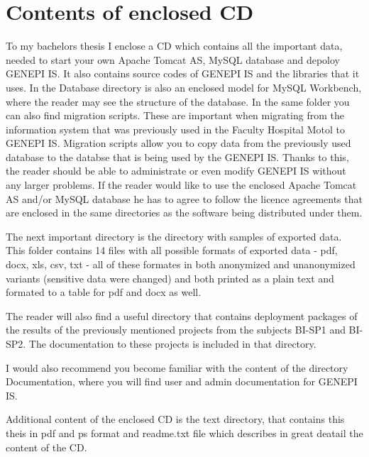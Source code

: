 \documentclass[thesis=B,english]{FITthesis}[2012/10/20]
\begin{document}
\chapter{Contents of enclosed CD}
To my bachelors thesis I enclose a CD which contains all the important data, needed to start your own Apache Tomcat AS, MySQL database and depoloy GENEPI IS. It also contains source codes of GENEPI IS and the libraries that it uses. In the Database directory is also an enclosed model for MySQL Workbench, where the reader may see the structure of the database. In the same folder you can also find migration scripts. These are important when migrating from the information system that was previously used in the Faculty Hospital Motol to GENEPI IS. Migration scripts allow you to copy data from the previously used database to the databse that is being used by the GENEPI IS. Thanks to this, the reader should be able to administrate or even modify GENEPI IS without any larger problems. If the reader would like to use the enclosed Apache Tomcat AS and/or MySQL database he has to agree to follow the licence agreements that are enclosed in the same directories as the software being distributed under them.

The next important directory is the directory with samples of exported data. This folder contains 14 files with all possible formats of exported data - pdf, docx, xls, csv, txt - all of these formates in both anonymized and unanonymized variants (sensitive data were changed) and both printed as a plain text and formated to a table for pdf and docx as well.

The reader will also find a useful directory that contains deployment packages of the results of the previously mentioned projects from the subjects BI-SP1 and BI-SP2. The documentation to these projects is included in that directory.

I would also recommend you become familiar with the content of the directory Documentation, where you will find user and admin documentation for GENEPI IS.

Additional content of the enclosed CD is the text directory, that contains this theis in pdf and ps format and readme.txt file which describes in great deatail the content of the CD.
\end{document}
